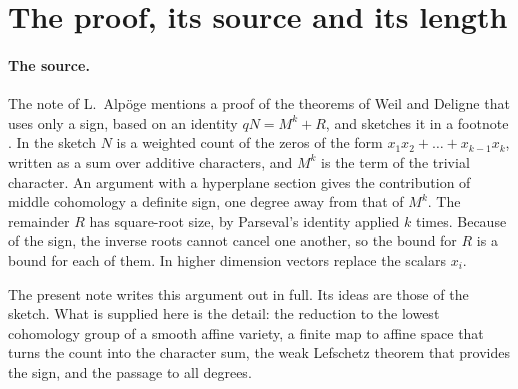 \documentclass[11pt,a4paper]{article}
\theoremstyle{plain}
\theoremstyle{remark}
\begin{document}
\section{The proof, its source and its length}

\paragraph{The source.}
The note \cite{Alpoge} of L.~Alp\"oge mentions a proof of the theorems of Weil and Deligne that uses only a sign,
based on an identity $qN=M^k+R$, and sketches it in a footnote \cite[p.~2 and footnote 3]{Alpoge}. In the sketch $N$
is a weighted count of the zeros of the form $x_1x_2+\dots+x_{k-1}x_k$, written as a sum over additive characters, and
$M^k$ is the term of the trivial character. An argument with a hyperplane section gives the contribution of middle
cohomology a definite sign, one degree away from that of $M^k$. The remainder $R$ has square-root size, by Parseval's
identity applied $k$ times. Because of the sign, the inverse roots cannot cancel one another, so the bound for $R$ is
a bound for each of them. In higher dimension vectors replace the scalars $x_i$.

The present note writes this argument out in full. Its ideas are those of the sketch. What is supplied here is the
detail: the reduction to the lowest cohomology group of a smooth affine variety, a finite map to affine space that
turns the count into the character sum, the weak Lefschetz theorem that provides the sign, and the passage to all
degrees.
\end{document}

